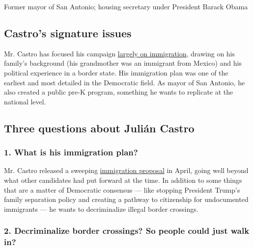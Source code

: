 Former mayor of San Antonio; housing secretary under President Barack
Obama

\hypertarget{castros-signature-issues}{%
\subsection{Castro's signature issues}\label{castros-signature-issues}}

Mr. Castro has focused his campaign
\href{https://www.nytimes.com/2019/06/26/us/politics/julian-castro-immigration.html}{largely
on immigration}, drawing on his family's background (his grandmother was
an immigrant from Mexico) and his political experience in a border
state. His immigration plan was one of the earliest and most detailed in
the Democratic field. As mayor of San Antonio, he also created a public
pre-K program, something he wants to replicate at the national level.

\hypertarget{three-questions-about-juliuxe1n-castro}{%
\subsection{Three questions about Julián
Castro}\label{three-questions-about-juliuxe1n-castro}}

\hypertarget{1-what-is-his-immigration-plan}{%
\subsubsection{\texorpdfstring{\textbf{1. What is his immigration
plan?}}{1. What is his immigration plan?}}\label{1-what-is-his-immigration-plan}}

Mr. Castro released a sweeping
\href{https://medium.com/@JulianCastro2020/putting-people-first-e0f765cee00c}{immigration
proposal} in April, going well beyond what other candidates had put
forward at the time. In addition to some things that are a matter of
Democratic consensus --- like stopping President Trump's family
separation policy and creating a pathway to citizenship for undocumented
immigrants --- he wants to decriminalize illegal border crossings.

\hypertarget{2-decriminalize-border-crossings-so-people-could-just-walk-in}{%
\subsubsection{\texorpdfstring{\textbf{2. Decriminalize border
crossings? So people could just walk
in?}}{2. Decriminalize border crossings? So people could just walk in?}}\label{2-decriminalize-border-crossings-so-people-could-just-walk-in}}

